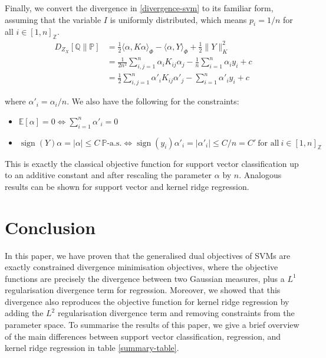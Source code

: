 \documentclass{article}
\begin{document}
Finally, we convert the divergence in \ref{divergence-svm} to its familiar form, assuming that the variable $I$ is uniformly distributed, which means $p_i = 1/n$ for all $i \in [1,n]_\mathbb{Z}$.
\begin{align}
D_{Z_X}[\mathbb{Q}\|\mathbb{P}] & = \frac{1}{2} \langle \alpha , K \alpha \rangle_{\Phi} - \langle \alpha , Y \rangle_{\Phi} + \frac{1}{2}\| Y\|_K^2 \\
& = \frac{1}{2n^2} \sum_{i,j=1}^n \alpha_i K_{ij}  \alpha_j - \frac{1}{n}\sum_{i=1}^n \alpha_i  y_i + c \\
& = \frac{1}{2} \sum_{i,j=1}^n \alpha'_i K_{ij} \alpha'_j - \sum_{i=1}^n \alpha'_i y_i + c 
\end{align}

where $\alpha'_i =  \alpha_i/n$. We also have the following for the constraints:
\begin{itemize}
    \item $\mathbb{E}[\alpha] = 0 \Leftrightarrow \sum_{i=1}^n \alpha'_i = 0$
    \item $\operatorname{sign}(Y)\alpha = |\alpha| \le C \ \mathbb{P}\text{-a.s.} \Leftrightarrow \operatorname{sign}(y_i) \alpha'_i = |\alpha'_i| \le C/n = C' \ \text{for all} \ i \in [1,n]_\mathbb{Z}$
\end{itemize}

This is exactly the classical objective function for support vector classification up to an additive constant and after rescaling the parameter $\alpha$ by $n$. Analogous results can be shown for support vector and kernel ridge regression.
    
\section{Conclusion} \label{conclusion}

In this paper, we have proven that the generalised dual objectives of SVMs are exactly constrained divergence minimisation objectives, where the objective functions are precisely the divergence between two Gaussian measures, plus a $L^1$ regularisation divergence term for regression. Moreover, we showed that this divergence also reproduces the objective function for kernel ridge regression by adding the $L^2$ regularisation divergence term and removing constraints from the parameter space. To summarise the results of this paper, we give a brief overview of the main differences between support vector classification, regression, and kernel ridge regression in table \ref{summary-table}.
\end{document}
